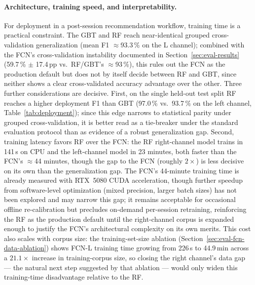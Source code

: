 \paragraph{Architecture, training speed, and interpretability.}
For deployment in a post-session recommendation workflow, training time is a practical
constraint.  The GBT and RF reach near-identical grouped cross-validation
generalization (mean F1 $\approx$93.3\,\% on the L channel); combined with the
FCN's cross-validation instability documented in Section~\ref{sec:eval-results}
(59.7\,\% $\pm$ 17.4\,pp vs.\ RF/GBT's $\approx$93\,\%), this rules out the FCN
as the production default but does not by itself decide between RF and GBT,
since neither shows a clear cross-validated accuracy advantage over the other.
Three further considerations are decisive. First, on the single held-out test
split RF reaches a higher deployment F1 than GBT (97.0\,\% vs.\ 93.7\,\% on the
left channel, Table~\ref{tab:deployment}); since this edge narrows to
statistical parity under grouped cross-validation, it is better read as a
tie-breaker under the standard evaluation protocol than as evidence of a
robust generalization gap. Second, training latency favors RF over the FCN:
the RF right-channel model trains in 141\,s on CPU and the
left-channel model in 23 minutes, both faster than the FCN's $\approx$44 minutes,
though the gap to the FCN (roughly $2\times$) is less decisive on its own than
the generalization gap.  The FCN's 44-minute training time is already measured
with RTX~5080 CUDA acceleration, though further speedup from software-level
optimization (mixed precision, larger batch sizes) has not been explored and
may narrow this gap; it remains acceptable for occasional offline re-calibration
but precludes on-demand per-session retraining, reinforcing the RF as the
production default until the right-channel corpus is expanded enough to justify
the FCN's architectural complexity on its own merits. This cost also scales with
corpus size: the training-set-size ablation (Section~\ref{sec:eval-fcn-data-ablation})
shows FCN-L training time growing from 226\,s to 44.9\,min across a $21.1\times$
increase in training-corpus size, so closing the right channel's data gap ---
the natural next step suggested by that ablation --- would only widen this
training-time disadvantage relative to the RF.

